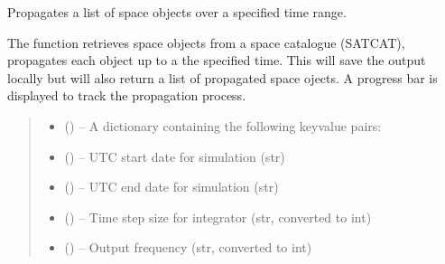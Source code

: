 \documentclass[letterpaper,10pt,english]{sphinxmanual}
\begin{document}

\begin{fulllineitems}
\label{\detokenize{fspsim:fspsim.simulate.run_sim}}
\pysigstartsignatures
{}
\pysigstopsignatures
\sphinxAtStartPar
Propagates a list of space objects over a specified time range.

\sphinxAtStartPar
The function retrieves space objects from a space catalogue (SATCAT), propagates each object
up to a the specified time. This will save the output locally but will also return a list of propagated
space ojects. A progress bar is displayed to track the propagation process.
\begin{quote}\begin{description}
\begin{itemize}
\item {} 
\sphinxAtStartPar
{} (\sphinxstyleliteralemphasis{\sphinxupquote{\sphinxhyphen{}}}) – A dictionary containing the following key\sphinxhyphen{}value pairs:

\item {} 
\sphinxAtStartPar
{} (\sphinxstyleliteralemphasis{\sphinxupquote{\sphinxhyphen{}}}) – UTC start date for simulation (str)

\item {} 
\sphinxAtStartPar
{} (\sphinxstyleliteralemphasis{\sphinxupquote{\sphinxhyphen{}}}) – UTC end date for simulation (str)

\item {} 
\sphinxAtStartPar
{} (\sphinxstyleliteralemphasis{\sphinxupquote{\sphinxhyphen{}}}) – Time step size for integrator (str, converted to int)

\item {} 
\sphinxAtStartPar
{} (\sphinxstyleliteralemphasis{\sphinxupquote{\sphinxhyphen{}}}) – Output frequency (str, converted to int)


\end{itemize}
\end{description}
\end{quote}
\end{fulllineitems}
\end{document}
